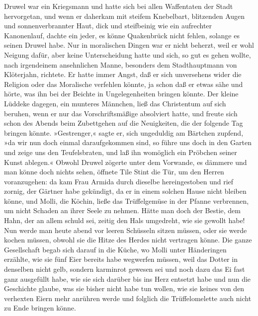 Druwel war ein Kriegsmann und hatte sich bei allen Waffentaten der
Stadt hervorgetan, und wenn er daherkam mit steifem Knebelbart,
blitzenden Augen und sonnenverbrannter Haut, dick und steifbeinig
wie ein aufrechter Kanonenlauf, dachte ein jeder, es könne
Quakenbrück nicht fehlen, solange es seinen Druwel habe. Nur in
moralischen \pagenum{[15]} Dingen war er nicht beherzt, weil er
wohl Neigung dafür, aber keine Unterscheidung hatte und sich, so
gut es gehen wollte, nach irgendeinem ansehnlichen Manne, besonders
dem Stadthauptmann von Klöterjahn, richtete. Er hatte immer Angst,
daß er sich unversehens wider die Religion oder das Moralische
verfehlen könnte, ja schon daß er etwas sähe und hörte, was ihn bei
der Beichte in Ungelegenheiten bringen könnte. Der kleine Lüddeke
dagegen, ein munteres Männchen, ließ das Christentum auf sich
beruhen, wenn er nur das Vorschriftsmäßige absolviert hatte, und
freute sich schon des Abends beim Zubettgehen auf die Neuigkeiten,
die der folgende Tag bringen könnte. »Gestrenger,« sagte er, sich
ungeduldig am Bärtchen zupfend, »da wir nun doch einmal
daraufgekommen sind, so führe uns doch in den Garten und zeige uns
den Teufelsbraten, und laß ihn womöglich ein Pröbchen seiner Kunst
ablegen.« Obwohl Druwel zögerte unter dem Vorwande, es dämmere und
man könne doch nichts sehen, öffnete Tile Stint die Tür, um den
Herren voranzugehen: da kam Frau Armida durch dieselbe
hereingestoben und rief zornig, der Gärtner habe gekündigt, da er
in einem solchen Hause nicht bleiben könne, und Molli, die Köchin,
ließe das Trüffelgemüse in der Pfanne verbrennen, um nicht Schaden
an ihrer Seele zu nehmen. Hätte man doch der Bestie, dem Hahn, der
an allem schuld sei, zeitig den Hals umgedreht, wie sie gewollt
habe! Nun werde man heute abend vor leeren Schüsseln sitzen müssen,
oder sie werde kochen müssen, obwohl sie die Hitze des Herdes nicht
vertragen könne. Die ganze Gesellschaft begab sich darauf in die
Küche, wo Molli unter Händeringen erzählte, wie sie fünf Eier
bereits habe wegwerfen müssen, weil das Dotter in denselben nicht
gelb, \pagenum{[16]} sondern karminrot gewesen sei und noch dazu
das Ei fast ganz ausgefüllt habe, wie sie sich darüber bis ins Herz
entsetzt habe und nun die Geschichte glaube, was sie bisher nicht
habe tun wollen, wie sie keines von den verhexten Eiern mehr
anrühren werde und folglich die Trüffelomelette auch nicht zu Ende
bringen könne.

